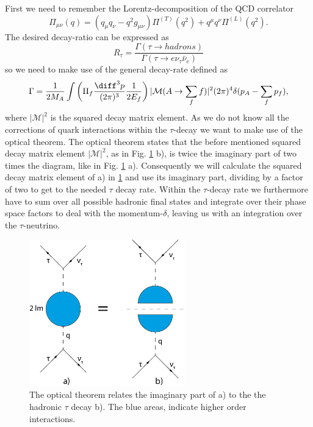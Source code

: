 First we need to remember the Lorentz-decomposition of the QCD correlator
\begin{equation}
	\label{eq:appTauLorentzDecomposition}
	\Pi_{\mu\nu} (q) = (q_\mu q_\nu - q^2 g_{\mu\nu}) \Pi^{(T)}(q^2) + q^\mu q^\nu \Pi^{(L)} (q^2).
\end{equation}
The desired decay-ratio can be expressed as
\begin{equation}
	R_\tau = \frac{\Gamma(\tau \to hadrons)}{\Gamma(\tau\to e \nu_\tau \bar \nu_e)}
\end{equation}
so we need to make use of the general decay-rate defined as
\begin{equation}
	\Gamma = \frac{1}{2 M_A} \int \left( \Pi_f \frac{\diff^3 p}{(2\pi)^3} \frac{1}{2 E_f} \right) | \mathcal{M} (A \to \sum_f f) |^2 (2\pi)^4 \delta(p_A - \sum_f p_f),
\end{equation}
where $|\mathcal{M}|^2$ is the squared decay matrix element.
As we do not know all the corrections of quark interactions within the $\tau$-decay we want to make use of the optical theorem. The optical theorem states that the before mentioned squared decay matrix element $|\mathcal{M}|^2$, as in Fig. \ref{fig:tauOpticalTheorem} b), is twice the imaginary part of two times the diagram, like in Fig. \ref{fig:tauOpticalTheorem} a). Consequently we will calculate the squared decay matrix element of a) in \ref{fig:tauOpticalTheorem} and use its imaginary part, dividing by a factor of two to get to the needed $\tau$ decay rate. Within the $\tau$-decay rate we furthermore have to sum over all possible hadronic final states and integrate over their phase space factors to deal with the momentum-$\delta$, leaving us with an integration over the $\tau$-neutrino.
\begin{figure}[t]
	\label{fig:tauOpticalTheorem}
	\centering
	\includegraphics[width=0.6\textwidth]{img/appendix/tauOpticalTheorem.png}
	\caption{The optical theorem relates the imaginary part of a) to the the hadronic $\tau$ decay b). The blue areas, indicate higher order interactions.}
\end{figure}

